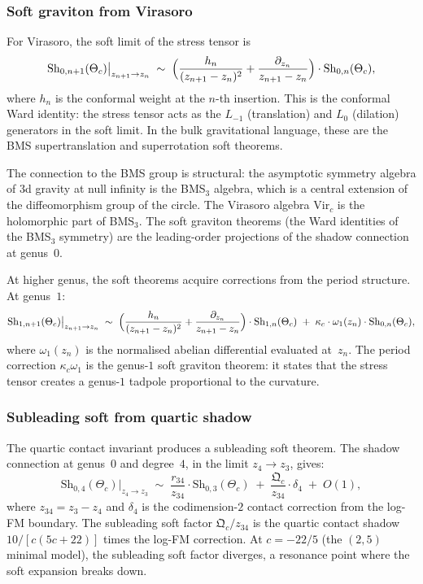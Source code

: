 \subsubsection*{Soft graviton from Virasoro}

For Virasoro, the soft limit of the stress tensor is
\[
\mathrm{Sh}_{0,n+1}(\Theta_c)\big|_{z_{n+1}\to z_n}
\;\sim\;
\Bigl(\frac{h_n}{(z_{n+1}-z_n)^2}
+\frac{\partial_{z_n}}{z_{n+1}-z_n}\Bigr)
\cdot\mathrm{Sh}_{0,n}(\Theta_c),
\]
where $h_n$ is the conformal weight at the $n$-th insertion.
This is the conformal Ward identity: the stress tensor acts as
the $L_{-1}$ (translation) and $L_0$ (dilation) generators in
the soft limit. In the bulk gravitational language, these
are the BMS supertranslation and superrotation soft theorems.

The connection to the BMS group is structural:
the asymptotic symmetry algebra of 3d gravity at null
infinity is the BMS$_3$ algebra, which is a central extension of
the diffeomorphism group of the circle. The Virasoro algebra
$\mathrm{Vir}_c$ is the holomorphic part of BMS$_3$. The soft
graviton theorems (the Ward identities of the BMS$_3$ symmetry)
are the leading-order projections of the shadow connection at
genus~$0$.

At higher genus, the soft theorems acquire corrections from the
period structure. At genus~$1$:
\[
\mathrm{Sh}_{1,n+1}(\Theta_c)\big|_{z_{n+1}\to z_n}
\;\sim\;
\Bigl(\frac{h_n}{(z_{n+1}-z_n)^2}
+\frac{\partial_{z_n}}{z_{n+1}-z_n}\Bigr)
\cdot\mathrm{Sh}_{1,n}(\Theta_c)
\;+\;\kappa_c\cdot\omega_1(z_n)\cdot
\mathrm{Sh}_{0,n}(\Theta_c),
\]
where $\omega_1(z_n)$ is the normalised abelian differential
evaluated at~$z_n$. The period correction $\kappa_c\omega_1$
is the genus-$1$ soft graviton theorem: it states that the
stress tensor creates a genus-$1$ tadpole proportional to the
curvature.

\subsubsection*{Subleading soft from quartic shadow}

The quartic contact invariant produces a subleading soft theorem.
The shadow connection at genus~$0$ and degree~$4$, in the limit
$z_4\to z_3$, gives:
\[
\mathrm{Sh}_{0,4}(\Theta_c)\big|_{z_4\to z_3}
\;\sim\;
\frac{r_{34}}{z_{34}}\cdot\mathrm{Sh}_{0,3}(\Theta_c)
\;+\;
\frac{\mathfrak Q_c}{z_{34}}\cdot\delta_4
\;+\;O(1),
\]
where $z_{34}=z_3-z_4$ and $\delta_4$ is the
codimension-$2$ contact correction from the log-FM boundary.
The subleading soft factor $\mathfrak Q_c/z_{34}$ is the
quartic contact shadow $10/[c(5c+22)]$ times the log-FM
correction. At $c=-22/5$ (the $(2,5)$ minimal model), the
subleading soft factor diverges, a resonance point where the
soft expansion breaks down.

